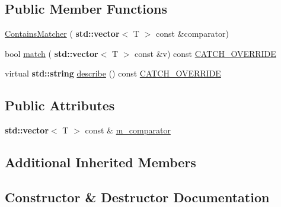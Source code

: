 \subsection*{Public Member Functions}
\begin{DoxyCompactItemize}
\item 
\hyperlink{struct_catch_1_1_matchers_1_1_vector_1_1_contains_matcher_ad8e92c8399be6dce75bb5702cdfab700}{Contains\+Matcher} (\textbf{ std\+::vector}$<$ T $>$ const \&comparator)
\item 
bool \hyperlink{struct_catch_1_1_matchers_1_1_vector_1_1_contains_matcher_aba81516816a6796124dd4fe4843e7284}{match} (\textbf{ std\+::vector}$<$ T $>$ const \&v) const \hyperlink{catch_8hpp_a8ecdce4d3f57835f707915ae831eb847}{C\+A\+T\+C\+H\+\_\+\+O\+V\+E\+R\+R\+I\+DE}
\item 
virtual \textbf{ std\+::string} \hyperlink{struct_catch_1_1_matchers_1_1_vector_1_1_contains_matcher_add1a31f049cec89f980424ecdb7027ac}{describe} () const \hyperlink{catch_8hpp_a8ecdce4d3f57835f707915ae831eb847}{C\+A\+T\+C\+H\+\_\+\+O\+V\+E\+R\+R\+I\+DE}
\end{DoxyCompactItemize}
\subsection*{Public Attributes}
\begin{DoxyCompactItemize}
\item 
\textbf{ std\+::vector}$<$ T $>$ const  \& \hyperlink{struct_catch_1_1_matchers_1_1_vector_1_1_contains_matcher_a83d051166e4ed0d535219ad6ee99abb2}{m\+\_\+comparator}
\end{DoxyCompactItemize}
\subsection*{Additional Inherited Members}


\subsection{Constructor \& Destructor Documentation}
\mbox{\label{struct_catch_1_1_matchers_1_1_vector_1_1_contains_matcher_ad8e92c8399be6dce75bb5702cdfab700}} 
